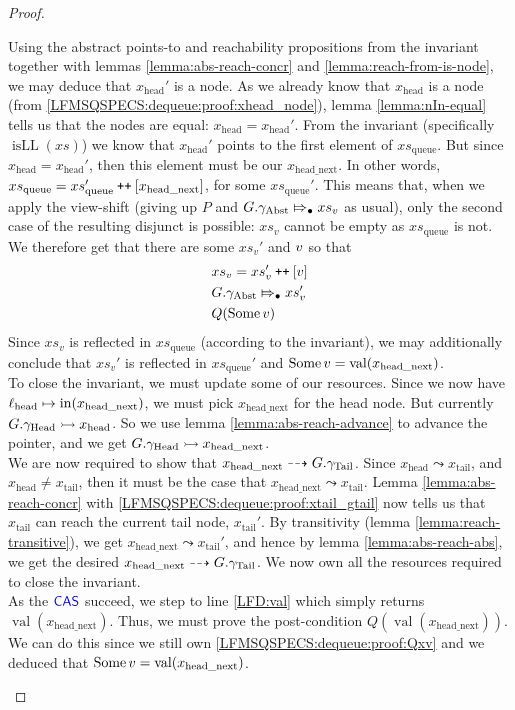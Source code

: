 \documentclass[a4paper, 10pt]{report}
\theoremstyle{definition}
\newcommand{\xsc}{xs}
\newcommand{\xsqueue}{xs_{\mathrm{queue}}}
\newcommand{\isLL}{\operatorname{isLL}}
\newcommand{\locN}[1]{\loc_{\mathrm{#1}}}
\newcommand{\lochead}{\locN{head}}
\newcommand{\nIn}[1]{\operatorname{in}(#1)}
\newcommand{\nVal}[1]{\operatorname{val}(#1)}
\newcommand{\node}{x}
\newcommand{\nodeN}[1]{\node_{\mathrm{#1}}}
\newcommand{\nodehead}{\nodeN{head}}
\newcommand{\nodetail}{\nodeN{tail}}
\newcommand{\nodeheadnext}{\nodeN{head\_next}}
\newcommand{\absvalue}{\val}
\newcommand{\absvalueList}{xs_v}
\newcommand{\Qg}{G}
\newcommand{\gabst}{\gname_{\mathrm{Abst}}}
\newcommand{\ghead}{\gname_{\mathrm{Head}}}
\newcommand{\gtail}{\gname_{\mathrm{Tail}}}
\newcommand\catenate{\mathbin{\text{\ttfamily\upshape ++}}}
\newcommand{\abstractstateauth}[2]{#1 \Mapsto_{\bullet} #2}
\newcommand{\reach}[2]{#1 \leadsto #2}
\newcommand{\ar}[2]{#1 \dashrightarrow #2}
\newcommand{\ap}[2]{#1 \rightarrowtail #2}
\begin{document}
\begin{proof}
\begin{itemize}
\begin{itemize}
      Using the abstract points-to and reachability propositions from the invariant together with lemmas \ref{lemma:abs-reach-concr} and \ref{lemma:reach-from-is-node}, we may deduce that $\nodehead'$ is a node. As we already know that $\nodehead$ is a node (from \ref{LFMSQSPECS:dequeue:proof:xhead_node}), lemma \ref{lemma:nIn-equal} tells us that the nodes are equal: $\nodehead = \nodehead'$. From the invariant (specifically $\isLL(\xsc)$) we know that $\nodehead'$ points to the first element of $\xsqueue$. But since $\nodehead = \nodehead'$, then this element must be our $\nodeheadnext$. In other words, $\xsqueue = \xsqueue' \catenate [\nodeheadnext]$, for some $\xsqueue'$.
      This means that, when we apply the view-shift (giving up $P$ and $\abstractstateauth{\Qg.\gabst}{\absvalueList}$ as usual), only the second case of the resulting disjunct is possible: $\absvalueList$ cannot be empty as $\xsqueue$ is not. We therefore get that there are some $\absvalueList'$ and $\absvalue$ so that
      \begin{align}
        &\absvalueList = \absvalueList' \catenate [\absvalue]\\
        &\abstractstateauth{\Qg.\gabst}{\absvalueList'}\\
        &Q(\Some \absvalue)\label{LFMSQSPECS:dequeue:proof:Qxv}
      \end{align}
      Since $\absvalueList$ is reflected in $\xsqueue$ (according to the invariant), we may additionally conclude that $\absvalueList'$ is reflected in $\xsqueue'$ and $\Some \absvalue = \nVal{\nodeheadnext}$.\\
      To close the invariant, we must update some of our resources. Since we now have $\lochead \mapsto \nIn{\nodeheadnext}$, we must pick $\nodeheadnext$ for the head node. But currently $\ap{\Qg.\ghead}{\nodehead}$. So we use lemma \ref{lemma:abs-reach-advance} to advance the pointer, and we get $\ap{\Qg.\ghead}{\nodeheadnext}$.\\
      We are now required to show that $\ar{\nodeheadnext}{\Qg.\gtail}$. Since $\reach{\nodehead}{\nodetail}$, and $\nodehead \neq \nodetail$, then it must be the case that $\reach{\nodeheadnext}{\nodetail}$. Lemma \ref{lemma:abs-reach-concr} with \ref{LFMSQSPECS:dequeue:proof:xtail_gtail} now tells us that $\nodetail$ can reach the current tail node, $\nodetail'$. By transitivity (lemma \ref{lemma:reach-transitive}), we get $\reach{\nodeheadnext}{\nodetail'}$, and hence by lemma \ref{lemma:abs-reach-abs}, we get the desired $\ar{\nodeheadnext}{\Qg.\gtail}$. We now own all the resources required to close the invariant.\\
      As the $\textsf{\color{blue} CAS}$ succeed, we step to line \ref{LFD:val} which simply returns $\nVal{\nodeheadnext}$. Thus, we must prove the post-condition $Q(\nVal{\nodeheadnext})$. We can do this since we still own \ref{LFMSQSPECS:dequeue:proof:Qxv} and we deduced that $\Some \absvalue = \nVal{\nodeheadnext}$.
    \end{itemize}


\end{itemize}
\end{proof}
\end{document}
